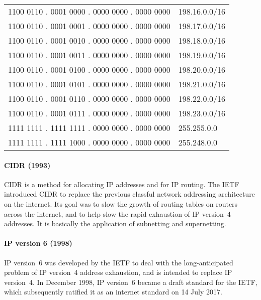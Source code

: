 \begin{center}
\tosfstyle
\begin{tabular}{@{}ll@{}}
\textcolor{spot1}{1100 0110 . 0001 0}\textcolor{spot2}{000} . 0000 0000 . 0000 0000 & 198.16.0.0/16 \\
\textcolor{spot1}{1100 0110 . 0001 0}\textcolor{spot2}{001} . 0000 0000 . 0000 0000 & 198.17.0.0/16 \\
\textcolor{spot1}{1100 0110 . 0001 0}\textcolor{spot2}{010} . 0000 0000 . 0000 0000 & 198.18.0.0/16 \\
\textcolor{spot1}{1100 0110 . 0001 0}\textcolor{spot2}{011} . 0000 0000 . 0000 0000 & 198.19.0.0/16 \\
\textcolor{spot1}{1100 0110 . 0001 0}\textcolor{spot2}{100} . 0000 0000 . 0000 0000 & 198.20.0.0/16 \\
\textcolor{spot1}{1100 0110 . 0001 0}\textcolor{spot2}{101} . 0000 0000 . 0000 0000 & 198.21.0.0/16 \\
\textcolor{spot1}{1100 0110 . 0001 0}\textcolor{spot2}{110} . 0000 0000 . 0000 0000 & 198.22.0.0/16 \\
\textcolor{spot1}{1100 0110 . 0001 0}\textcolor{spot2}{111} . 0000 0000 . 0000 0000 & 198.23.0.0/16 \\
\midrule
1111 1111 . 1111 1111 . 0000 0000 . 0000 0000 & 255.255.0.0 \\
1111 1111 . 1111 1000 . 0000 0000 . 0000 0000 & 255.248.0.0 \\
\end{tabular}
\end{center}

\paragraph{\acf{CIDR} (1993)}
\Acl{CIDR} is a method for allocating \acs{IP} addresses and for \acs{IP} routing.
The \gls{IETF} introduced \acs{CIDR} to replace the previous classful network addressing architecture on the internet.
Its goal was to slow the growth of routing tables on routers across the internet, and to help slow the rapid exhaustion of \acs{IP} version~4 addresses.
It is basically the application of subnetting and supernetting.

\paragraph{\acs{IP} version 6 (1998)}
\acs{IP} version~6 was developed by the \gls{IETF} to deal with the long-anticipated problem of \acs{IP} version~4 address exhaustion, and is intended to replace \acs{IP} version~4.
In December 1998, \acs{IP} version~6 became a draft standard for the \gls{IETF}, which subsequently ratified it as an internet standard on 14 July 2017.

